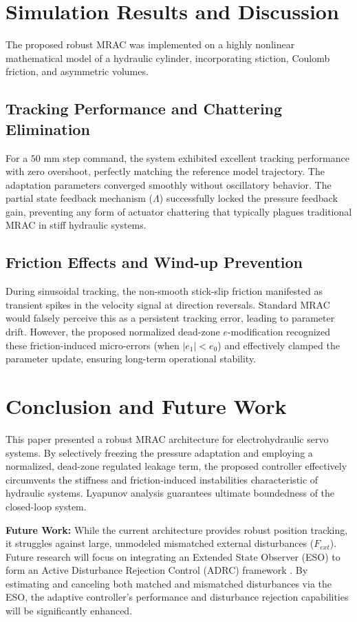 \documentclass[12pt,a4paper]{article}
\begin{document}
\section{Simulation Results and Discussion}
The proposed robust MRAC was implemented on a highly nonlinear mathematical model of a hydraulic cylinder, incorporating stiction, Coulomb friction, and asymmetric volumes.
\subsection{Tracking Performance and Chattering Elimination}
For a $50$ mm step command, the system exhibited excellent tracking performance with zero overshoot, perfectly matching the reference model trajectory. The adaptation parameters converged smoothly without oscillatory behavior. The partial state feedback mechanism ($\Lambda$) successfully locked the pressure feedback gain, preventing any form of actuator chattering that typically plagues traditional MRAC in stiff hydraulic systems.
\subsection{Friction Effects and Wind-up Prevention}
During sinusoidal tracking, the non-smooth stick-slip friction manifested as transient spikes in the velocity signal at direction reversals. Standard MRAC would falsely perceive this as a persistent tracking error, leading to parameter drift. However, the proposed normalized dead-zone $e$-modification recognized these friction-induced micro-errors (when $|e_1| < e_0$) and effectively clamped the parameter update, ensuring long-term operational stability.

\section{Conclusion and Future Work}
This paper presented a robust MRAC architecture for electrohydraulic servo systems. By selectively freezing the pressure adaptation and employing a normalized, dead-zone regulated leakage term, the proposed controller effectively circumvents the stiffness and friction-induced instabilities characteristic of hydraulic systems. Lyapunov analysis guarantees ultimate boundedness of the closed-loop system.

\textbf{Future Work:} While the current architecture provides robust position tracking, it struggles against large, unmodeled mismatched external disturbances ($F_{ext}$). Future research will focus on integrating an Extended State Observer (ESO) to form an Active Disturbance Rejection Control (ADRC) framework \cite{Wang2020}. By estimating and canceling both matched and mismatched disturbances via the ESO, the adaptive controller's performance and disturbance rejection capabilities will be significantly enhanced.
\end{document}
